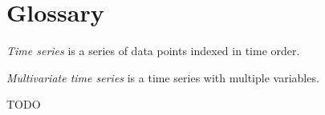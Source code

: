 % 
\chapter{Glossary}

\noindent
\emph{Time series} is a series of data points indexed in time order.

\noindent
\emph{Multivariate time series} is a time series with multiple variables.

TODO